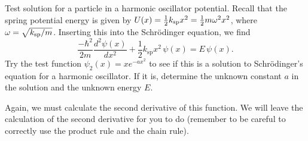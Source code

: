 \begin{example}{Test solution for a particle in a harmonic oscillator potential.}
Recall that the spring potential energy is given by 
$U(x) = \frac{1}{2}k_{\rm sp}x^2 = \frac{1}{2}m\omega^2x^2$, where 
$\omega = \sqrt{k_{\rm sp}/m}$.  Inserting this into the 
Schr\"odinger equation, we find
\begin{equation}
\frac{-\hbar^2}{2m}\frac{d^2\psi(x)}{dx^2} + \frac{1}{2}k_\text{sp}x^2\,\psi(x)
= E\,\psi(x).
\label{eq:schroed_spring}
\end{equation}
Try the test function $\psi_2(x)=xe^{-ax^2}$ to see if this is a solution
to Schr\"odinger's equation for a harmonic oscillator.  If it is,
determine the unknown constant $a$ in the solution and the unknown energy $E$.

\solution Again, we must calculate the second derivative of this
function.  We will leave the calculation of the second derivative for
you to do (remember to be careful to correctly use the product rule and
the chain rule).

\end{example}
